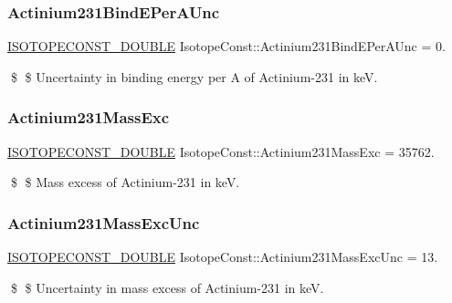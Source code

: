 \subsubsection{\texorpdfstring{Actinium231\+Bind\+E\+Per\+A\+Unc}{Actinium231BindEPerAUnc}}
{\footnotesize\ttfamily \mbox{\hyperlink{group___isotope_const-_macros_ga8f45a7272ce02c0b4c65c44636ed719a}{I\+S\+O\+T\+O\+P\+E\+C\+O\+N\+S\+T\+\_\+\+D\+O\+U\+B\+LE}} Isotope\+Const\+::\+Actinium231\+Bind\+E\+Per\+A\+Unc = 0.}

\$ \$ Uncertainty in binding energy per A of Actinium-\/231 in keV. \mbox{\label{group___isotope_const-_actinium-_ac231_ga1e97a84b084d62c6b1b78265dae078fe}} 
\subsubsection{\texorpdfstring{Actinium231\+Mass\+Exc}{Actinium231MassExc}}
{\footnotesize\ttfamily \mbox{\hyperlink{group___isotope_const-_macros_ga8f45a7272ce02c0b4c65c44636ed719a}{I\+S\+O\+T\+O\+P\+E\+C\+O\+N\+S\+T\+\_\+\+D\+O\+U\+B\+LE}} Isotope\+Const\+::\+Actinium231\+Mass\+Exc = 35762.}

\$ \$ Mass excess of Actinium-\/231 in keV. \mbox{\label{group___isotope_const-_actinium-_ac231_ga9ff507c726b3820a334b3d6ebe8c976a}} 
\subsubsection{\texorpdfstring{Actinium231\+Mass\+Exc\+Unc}{Actinium231MassExcUnc}}
{\footnotesize\ttfamily \mbox{\hyperlink{group___isotope_const-_macros_ga8f45a7272ce02c0b4c65c44636ed719a}{I\+S\+O\+T\+O\+P\+E\+C\+O\+N\+S\+T\+\_\+\+D\+O\+U\+B\+LE}} Isotope\+Const\+::\+Actinium231\+Mass\+Exc\+Unc = 13.}

\$ \$ Uncertainty in mass excess of Actinium-\/231 in keV. \mbox{\label{group___isotope_const-_actinium-_ac231_ga9d338ddb60d06e308fc01680825cd7bc}} 
